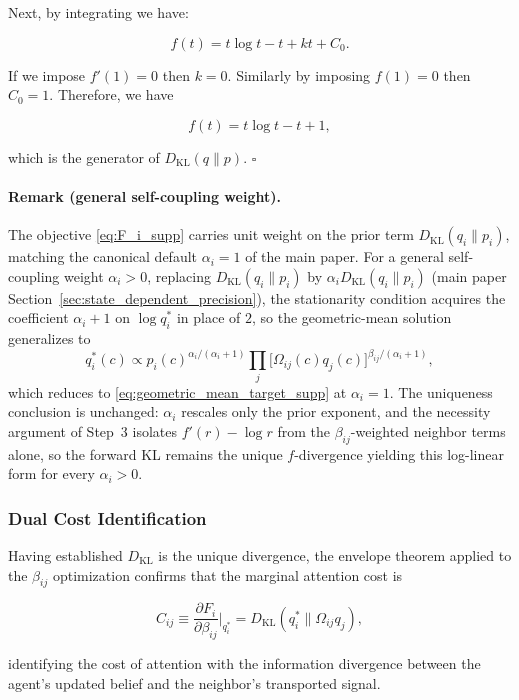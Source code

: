 \documentclass[twoside,11pt]{article}
\begin{document}
Next, by integrating we have:

\[
f(t) = t\log t - t + kt + C_0.
\]

If we impose $f'(1)=0$ then $k=0$. Similarly by imposing $f(1)=0$ then $C_0 = 1$. Therefore, we have

\[
f(t) = t\log t - t + 1,
\]

which is the generator of $D_{\mathrm{KL}}(q \| p)$. \hfill $\square$

\paragraph{Remark (general self-coupling weight).} The objective \eqref{eq:F_i_supp} carries unit weight on the prior term $D_{\mathrm{KL}}(q_i \| p_i)$, matching the canonical default $\alpha_i = 1$ of the main paper. For a general self-coupling weight $\alpha_i > 0$, replacing $D_{\mathrm{KL}}(q_i \| p_i)$ by $\alpha_i D_{\mathrm{KL}}(q_i \| p_i)$ (main paper Section~\ref{sec:state_dependent_precision}), the stationarity condition acquires the coefficient $\alpha_i + 1$ on $\log q_i^*$ in place of $2$, so the geometric-mean solution generalizes to
\begin{equation}
q_i^*(c) \propto p_i(c)^{\alpha_i/(\alpha_i + 1)} \prod_{j}\bigl[\Omega_{ij}(c) q_j(c)\bigr]^{\beta_{ij}/(\alpha_i + 1)},
\end{equation}
which reduces to \eqref{eq:geometric_mean_target_supp} at $\alpha_i = 1$. The uniqueness conclusion is unchanged: $\alpha_i$ rescales only the prior exponent, and the necessity argument of Step~3 isolates $f'(r) - \log r$ from the $\beta_{ij}$-weighted neighbor terms alone, so the forward KL remains the unique $f$-divergence yielding this log-linear form for every $\alpha_i > 0$.

\subsubsection{Dual Cost Identification}
Having established $D_{\mathrm{KL}}$ is the unique divergence, the envelope theorem applied to the $\beta_{ij}$ optimization confirms that the marginal attention cost is

\begin{equation}
C_{ij} \equiv \frac{\partial F_i}{\partial\beta_{ij}}\bigg|_{q_i^*}
= D_{\mathrm{KL}}(q_i^* \| \Omega_{ij}q_j),
\end{equation}

identifying the cost of attention with the information divergence between the agent's updated belief and the neighbor's transported signal.
\end{document}
